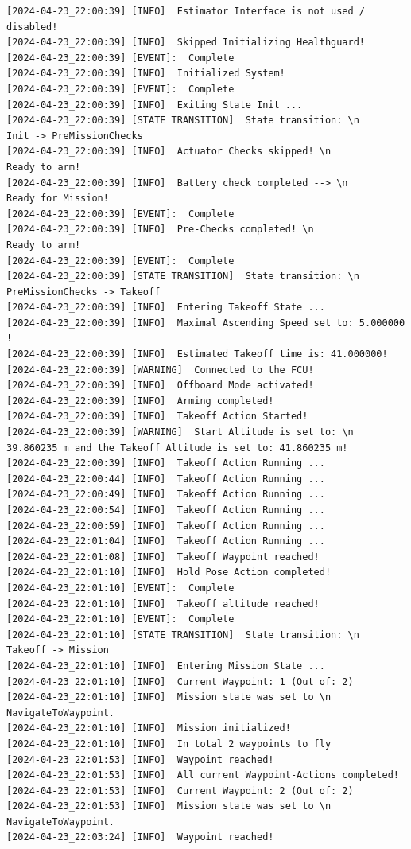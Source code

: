 \begin{lstlisting}
[2024-04-23_22:00:39] [INFO]  Estimator Interface is not used / disabled!
[2024-04-23_22:00:39] [INFO]  Skipped Initializing Healthguard!
[2024-04-23_22:00:39] [EVENT]:  Complete
[2024-04-23_22:00:39] [INFO]  Initialized System!
[2024-04-23_22:00:39] [EVENT]:  Complete
[2024-04-23_22:00:39] [INFO]  Exiting State Init ...
[2024-04-23_22:00:39] [STATE TRANSITION]  State transition: \n 
Init -> PreMissionChecks
[2024-04-23_22:00:39] [INFO]  Actuator Checks skipped! \n 
Ready to arm!
[2024-04-23_22:00:39] [INFO]  Battery check completed --> \n 
Ready for Mission!
[2024-04-23_22:00:39] [EVENT]:  Complete
[2024-04-23_22:00:39] [INFO]  Pre-Checks completed! \n 
Ready to arm!
[2024-04-23_22:00:39] [EVENT]:  Complete
[2024-04-23_22:00:39] [STATE TRANSITION]  State transition: \n 
PreMissionChecks -> Takeoff
[2024-04-23_22:00:39] [INFO]  Entering Takeoff State ...
[2024-04-23_22:00:39] [INFO]  Maximal Ascending Speed set to: 5.000000 !
[2024-04-23_22:00:39] [INFO]  Estimated Takeoff time is: 41.000000!
[2024-04-23_22:00:39] [WARNING]  Connected to the FCU!
[2024-04-23_22:00:39] [INFO]  Offboard Mode activated!
[2024-04-23_22:00:39] [INFO]  Arming completed!
[2024-04-23_22:00:39] [INFO]  Takeoff Action Started!
[2024-04-23_22:00:39] [WARNING]  Start Altitude is set to: \n 
39.860235 m and the Takeoff Altitude is set to: 41.860235 m!
[2024-04-23_22:00:39] [INFO]  Takeoff Action Running ...
[2024-04-23_22:00:44] [INFO]  Takeoff Action Running ...
[2024-04-23_22:00:49] [INFO]  Takeoff Action Running ...
[2024-04-23_22:00:54] [INFO]  Takeoff Action Running ...
[2024-04-23_22:00:59] [INFO]  Takeoff Action Running ...
[2024-04-23_22:01:04] [INFO]  Takeoff Action Running ...
[2024-04-23_22:01:08] [INFO]  Takeoff Waypoint reached!
[2024-04-23_22:01:10] [INFO]  Hold Pose Action completed!
[2024-04-23_22:01:10] [EVENT]:  Complete
[2024-04-23_22:01:10] [INFO]  Takeoff altitude reached!
[2024-04-23_22:01:10] [EVENT]:  Complete
[2024-04-23_22:01:10] [STATE TRANSITION]  State transition: \n 
Takeoff -> Mission
[2024-04-23_22:01:10] [INFO]  Entering Mission State ...
[2024-04-23_22:01:10] [INFO]  Current Waypoint: 1 (Out of: 2)
[2024-04-23_22:01:10] [INFO]  Mission state was set to \n 
NavigateToWaypoint.
[2024-04-23_22:01:10] [INFO]  Mission initialized!
[2024-04-23_22:01:10] [INFO]  In total 2 waypoints to fly
[2024-04-23_22:01:53] [INFO]  Waypoint reached!
[2024-04-23_22:01:53] [INFO]  All current Waypoint-Actions completed!
[2024-04-23_22:01:53] [INFO]  Current Waypoint: 2 (Out of: 2)
[2024-04-23_22:01:53] [INFO]  Mission state was set to \n 
NavigateToWaypoint.
[2024-04-23_22:03:24] [INFO]  Waypoint reached!

\end{lstlisting}
